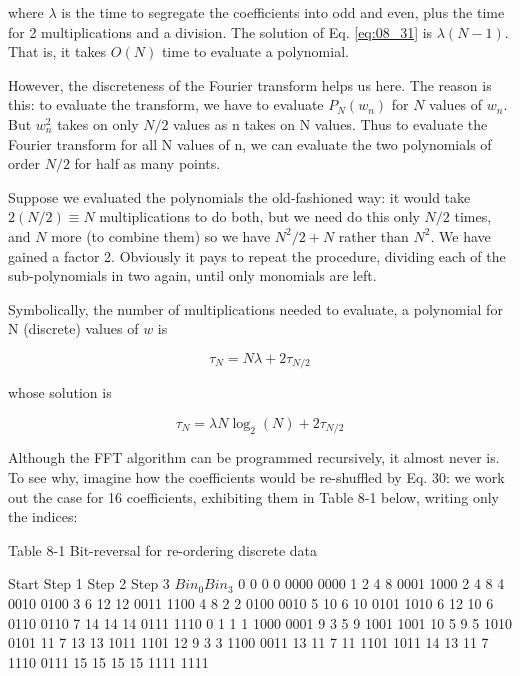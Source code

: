 where $\lambda$ is the time to segregate the coefficients into odd and even, plus the time for 2 multiplications and a division. The solution of Eq. \ref{eq:08_31} is $\lambda(N-1)$. That is, it takes $O(N)$ time to evaluate a polynomial.

However, the discreteness of the Fourier transform helps us here. The reason is this: to evaluate the transform, we have to evaluate $P_{N}(w_{n})$ for $N$ values of $w_{n}$. But $w_{n}^{2}$ takes on only $N/2$ values as n takes on N values. Thus to evaluate the Fourier transform for all N values of n, we can evaluate the two polynomials of order $N/2$ for half as many points.

Suppose we evaluated the polynomials the old-fashioned way: it would take $2(N/2)\equiv N$ multiplications to do both, but we need do this only $N/2$ times, and $N$ more (to combine them) so we have $N^{2}/2+N$ rather than $N^{2}$. We have gained a factor 2. Obviously it pays to repeat the procedure, dividing each of the sub-polynomials in two again, until only monomials are left.

Symbolically, the number of multiplications needed to evaluate, a polynomial for N (discrete) values of $w$ is

\begin{equation}
\tau_{N} = N\lambda + 2\tau_{N/2}
\end{equation}

whose solution is

\begin{equation}
\tau_{N} = \lambda N \log_{2}(N) + 2\tau_{N/2}
\end{equation}

Although the FFT algorithm can be programmed recursively, it almost never is. To see why, imagine how the coefficients would be re-shuffled by Eq. 30: we work out the case for 16 coefficients, exhibiting them in Table 8-1 below, writing only the indices:

Table 8-1 Bit-reversal for re-ordering discrete data

Start   Step 1  Step 2  Step 3    $Bin_0 Bin_3$
0       0       0       0         0000  0000
1       2       4       8         0001  1000
2       4       8       4         0010  0100
3       6       12      12        0011  1100
4       8       2       2         0100  0010
5       10      6       10        0101  1010
6       12      10      6         0110  0110
7       14      14      14        0111  1110
0       1       1       1         1000  0001
9       3       5       9         1001  1001
10      5       9       5         1010  0101
11      7       13      13        1011  1101
12      9       3       3         1100  0011
13      11      7       11        1101  1011
14      13      11      7         1110  0111
15      15      15      15        1111  1111

